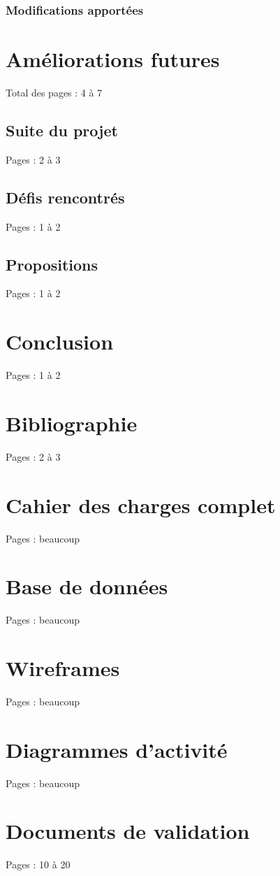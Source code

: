 \documentclass{eplmastersthesis_FR}
\begin{document}
			\subsection*{Modifications apportées}

	\chapter{Améliorations futures}

		Total des pages : 4 à 7

		\section{Suite du projet}

			Pages : 2 à 3

		\section{Défis rencontrés}

			Pages : 1 à 2

		\section{Propositions}

			Pages : 1 à 2

	\chapter{Conclusion}

		Pages : 1 à 2

	\chapter*{Bibliographie}

	{}
	

		Pages : 2 à 3

	\appendix

	\chapter{Cahier des charges complet}

		Pages : beaucoup

	\chapter{Base de données}

		Pages : beaucoup

	\chapter{Wireframes}

		Pages : beaucoup

	\chapter{Diagrammes d'activité}

		Pages : beaucoup

	\chapter{Documents de validation}
		Pages : 10 à 20
	\setlength{\parskip}{0em}
	\backcoverpage
\end{document}
